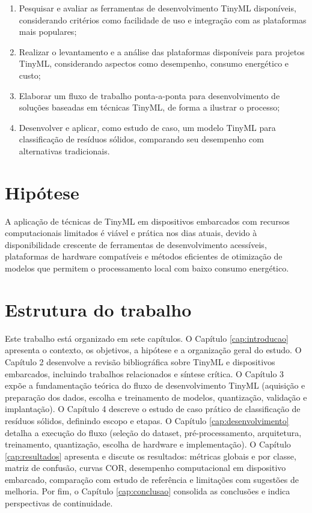 \documentclass[repeatfields,xlists,xpacks,oneside]{ufrgscca}
\begin{document}
\begin{enumerate}
    \item Pesquisar e avaliar as ferramentas de desenvolvimento TinyML disponíveis, considerando critérios como facilidade de uso e integração com as plataformas mais populares; \\
    
    \item Realizar o levantamento e a análise das plataformas disponíveis para projetos TinyML, considerando aspectos como desempenho, consumo energético e custo; \\
    
    \item Elaborar um fluxo de trabalho ponta-a-ponta para desenvolvimento de soluções baseadas em técnicas TinyML, de forma a ilustrar o processo; \\

    \item Desenvolver e aplicar, como estudo de caso, um modelo TinyML para classificação de resíduos sólidos, comparando seu desempenho com alternativas tradicionais.
\end{enumerate}

\section{Hipótese}
A aplicação de técnicas de TinyML em dispositivos embarcados com recursos computacionais limitados é viável e prática nos dias atuais, devido à disponibilidade crescente de ferramentas de desenvolvimento acessíveis, plataformas de hardware compatíveis e métodos eficientes de otimização de modelos que permitem o processamento local com baixo consumo energético.

\section{Estrutura do trabalho}
Este trabalho está organizado em sete capítulos. O Capítulo \ref{cap:introducao} apresenta o contexto, os objetivos, a hipótese e a organização geral do estudo. O Capítulo 2 desenvolve a revisão bibliográfica sobre TinyML e dispositivos embarcados, incluindo trabalhos relacionados e síntese crítica. O Capítulo 3 expõe a fundamentação teórica do fluxo de desenvolvimento TinyML (aquisição e preparação dos dados, escolha e treinamento de modelos, quantização, validação e implantação). O Capítulo 4 descreve o estudo de caso prático de classificação de resíduos sólidos, definindo escopo e etapas. O Capítulo \ref{cap:desenvolvimento} detalha a execução do fluxo (seleção do dataset, pré-processamento, arquitetura, treinamento, quantização, escolha de hardware e implementação). O Capítulo \ref{cap:resultados} apresenta e discute os resultados: métricas globais e por classe, matriz de confusão, curvas COR, desempenho computacional em dispositivo embarcado, comparação com estudo de referência e limitações com sugestões de melhoria. Por fim, o Capítulo \ref{cap:conclusao} consolida as conclusões e indica perspectivas de continuidade.
\end{document}
